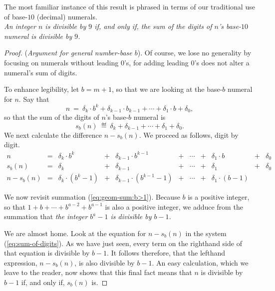 The most familiar instance of this result is phrased in terms of our
traditional use of base-$10$ (decimal) numerals. \\
{\it An integer $n$ is divisible by $9$ if, and only if, the sum of
  the digits of $n$'s base-$10$ numeral is divisible by $9$.}

\smallskip

\begin{proof}
({\it Argument for general number-base $b$}).
%
Of course, we lose no generality by focusing on numerals without
leading $0$'s, for adding leading $0$'s does not alter a numeral's sum
of digits.

To enhance legibility, let $b = m+1$, so that we are looking at the
base-$b$ numeral for $n$.  Say that
\[ n \ = \ \delta_k \cdot b^k + \delta_{k-1} \cdot b_{k-1} + \cdots +
\delta_1 \cdot b + \delta_0, \]
so that the sum of the digits of $n$'s base-$b$ numeral is
\[ s_b(n) \ \eqdef \ \delta_k + \delta_{k-1} + \cdots + \delta_1 + \delta_0. \]
We next calculate the difference $n - s_b(n)$.  We proceed as
follows, digit by digit.
\begin{equation}
\label{eq:sum-of-digits}
\begin{array}{ccccccccccc}
n & = &
\delta_k \cdot b^k & + & \delta_{k-1} \cdot b^{k-1} & + & \cdots
  & + & \delta_1 \cdot b & + & \delta_0 \\
s_b(n) & = &
\delta_k & + & \delta_{k-1} & + & \cdots & + & \delta_1 & + & \delta_0 \\
\hline
n - s_b(n) & = &
\delta_k \cdot (b^k -1) & + &
\delta_{k-1} \cdot (b^{k-1} -1) & + &
\cdots & + &
\delta_1 \cdot (b-1) & & 
\end{array}
\end{equation}

\medskip

We now revisit summation (\ref{eq:geom-sum:b>1}).  Because $b$ is a
positive integer, so that $1 + b + \cdots + b^{a-2} + b^{a-1}$ is also
a positive integer, we adduce from the summation that {\em the integer
  $b^a -1$ is divisible by $b-1$.}

We are almost home.  Look at the equation for $n - s_b(n)$ in the
system (\ref{eq:sum-of-digits}).  As we have just seen, every term on
the righthand side of that equation is divisible by $b-1$.  It follows
therefore, that the lefthand expression, $n - s_b(n)$, is also
divisible by $b-1$.  An easy calculation, which we leave to the
reader, now shows that this final fact means that $n$ is divisible by
$b-1$ if, and only if, $s_b(n)$ is.
\end{proof}


